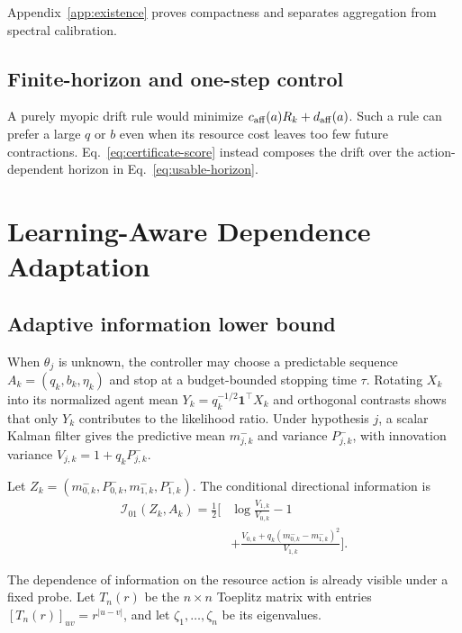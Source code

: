 \documentclass[journal]{IEEEtran}
\begin{document}
Appendix~\ref{app:existence} proves compactness and separates aggregation from spectral calibration.

\subsection{Finite-horizon and one-step control}
A purely myopic drift rule would minimize $c_{\rm aff}(a)R_k+d_{\rm aff}(a)$.
Such a rule can prefer a large $q$ or $b$ even when its resource cost leaves too few future contractions.
Eq.~\eqref{eq:certificate-score} instead composes the drift over the action-dependent horizon in Eq.~\eqref{eq:usable-horizon}.

\section{Learning-Aware Dependence Adaptation}
\subsection{Adaptive information lower bound}
When $\theta_j$ is unknown, the controller may choose a predictable sequence $A_k=(q_k,b_k,\eta_k)$ and stop at a budget-bounded stopping time $\tau$.
Rotating $X_k$ into its normalized agent mean $Y_k=q_k^{-1/2}\bm{1}^\top X_k$ and orthogonal contrasts shows that only $Y_k$ contributes to the likelihood ratio.
Under hypothesis $j$, a scalar Kalman filter gives the predictive mean $m^-_{j,k}$ and variance $P^-_{j,k}$, with innovation variance $V_{j,k}=1+q_kP^-_{j,k}$.

Let $Z_k=(m^-_{0,k},P^-_{0,k},m^-_{1,k},P^-_{1,k})$.
The conditional directional information is
\begin{equation}
\begin{aligned}
\mathcal{I}_{01}(Z_k,A_k)=\frac12\bigg[&\log\frac{V_{1,k}}{V_{0,k}}-1\\
&+\frac{V_{0,k}+q_k(m^-_{0,k}-m^-_{1,k})^2}{V_{1,k}}\bigg].
\end{aligned}
\label{eq:conditional-kl}
\end{equation}

The dependence of information on the resource action is already visible under a fixed probe.
Let $T_n(r)$ be the $n\times n$ Toeplitz matrix with entries $[T_n(r)]_{uv}=r^{|u-v|}$, and let $\zeta_1,\ldots,\zeta_n$ be its eigenvalues.
\end{document}
